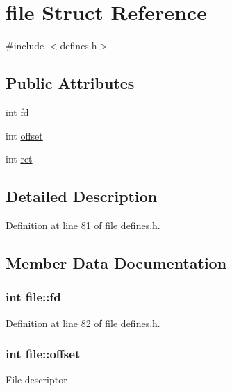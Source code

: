 \hypertarget{structfile}{\section{file Struct Reference}
\label{structfile}
}


{\ttfamily \#include $<$defines.\-h$>$}

\subsection*{Public Attributes}
\begin{DoxyCompactItemize}
\item 
int \hyperlink{structfile_abcdc3058fcb2b789cd4ce5f62f274363}{fd}
\item 
int \hyperlink{structfile_ad056d2081f3cab9ed4668689a02acaaf}{offset}
\item 
int \hyperlink{structfile_a6d285b7a32eb853a1dcb00014942d8ae}{ret}
\end{DoxyCompactItemize}


\subsection{Detailed Description}


Definition at line 81 of file defines.\-h.



\subsection{Member Data Documentation}
\hypertarget{structfile_abcdc3058fcb2b789cd4ce5f62f274363}{
\subsubsection[{fd}]{\setlength{\rightskip}{0pt plus 5cm}int file\-::fd}}\label{structfile_abcdc3058fcb2b789cd4ce5f62f274363}


Definition at line 82 of file defines.\-h.

\hypertarget{structfile_ad056d2081f3cab9ed4668689a02acaaf}{
\subsubsection[{offset}]{\setlength{\rightskip}{0pt plus 5cm}int file\-::offset}}\label{structfile_ad056d2081f3cab9ed4668689a02acaaf}
File descriptor 

